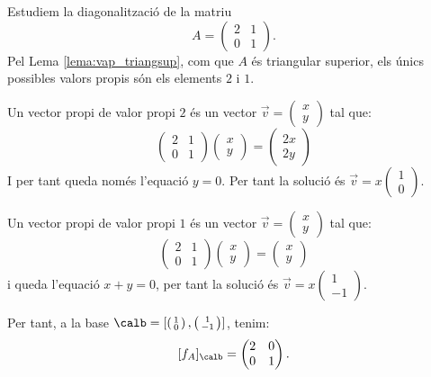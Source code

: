 \begin{exemple}\label{exem:mat2101}
Estudiem la diagonalització de la matriu
$$
A=\begin{pmatrix}
2 &  1 \\ 0 & 1
\end{pmatrix}.
$$
Pel Lema \ref{lema:vap_triangsup}, com que $A$ és triangular superior, els únics possibles valors propis són els elements $2$ i $1$.

Un vector propi de valor propi $2$ és un vector $\vec v=\left(\begin{smallmatrix} x \\ y \end{smallmatrix}\right)$ tal que:
$$
\begin{pmatrix}
2 &  1 \\ 0 & 1
\end{pmatrix}
\begin{pmatrix} x \\ y \end{pmatrix} =
\begin{pmatrix} 2x \\ 2y \end{pmatrix}
$$
I per tant queda només l'equació $y  = 0$. Per tant la solució és $\vec v= x\left(\begin{smallmatrix} 1 \\ 0 \end{smallmatrix}\right)$.

Un vector propi de valor propi $1$ és un vector $\vec v=\left(\begin{smallmatrix} x \\ y \end{smallmatrix}\right)$ tal que:
$$
\begin{pmatrix}
2 &  1 \\ 0 & 1
\end{pmatrix}
\begin{pmatrix} x \\ y \end{pmatrix} =
\begin{pmatrix} x \\ y \end{pmatrix}
$$
i queda l'equació $x+y=0$, per tant la solució és $\vec v=x\left(\begin{smallmatrix} 1 \\ -1 \end{smallmatrix}\right)$.

Per tant, a la base $\calb=[\left(\begin{smallmatrix} 1 \\ 0 \end{smallmatrix}\right),\left(\begin{smallmatrix} 1 \\ -1 \end{smallmatrix}\right)]$, tenim:
$$
[f_A]_\calb=\begin{pmatrix}
2 & 0 \\ 0 & 1
\end{pmatrix}.
$$
\end{exemple}
